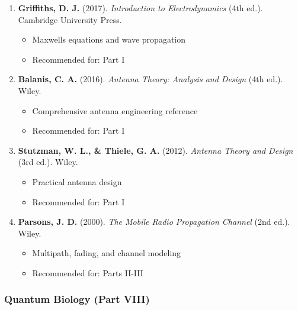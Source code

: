 \begin{enumerate}
\def\labelenumi{\arabic{enumi}.}
\setcounter{enumi}{9}
\tightlist
\item
  \textbf{Griffiths, D. J.} (2017). \emph{Introduction to
  Electrodynamics} (4th ed.). Cambridge University Press.

  \begin{itemize}
  \tightlist
  \item
    Maxwell\textquotesingle s equations and wave propagation
  \item
    Recommended for: Part I
  \end{itemize}
\item
  \textbf{Balanis, C. A.} (2016). \emph{Antenna Theory: Analysis and
  Design} (4th ed.). Wiley.

  \begin{itemize}
  \tightlist
  \item
    Comprehensive antenna engineering reference
  \item
    Recommended for: Part I
  \end{itemize}
\item
  \textbf{Stutzman, W. L., \& Thiele, G. A.} (2012). \emph{Antenna
  Theory and Design} (3rd ed.). Wiley.

  \begin{itemize}
  \tightlist
  \item
    Practical antenna design
  \item
    Recommended for: Part I
  \end{itemize}
\item
  \textbf{Parsons, J. D.} (2000). \emph{The Mobile Radio Propagation
  Channel} (2nd ed.). Wiley.

  \begin{itemize}
  \tightlist
  \item
    Multipath, fading, and channel modeling
  \item
    Recommended for: Parts II-III
  \end{itemize}
\end{enumerate}

\subsubsection{Quantum Biology (Part
VIII)}\label{quantum-biology-part-viii}

